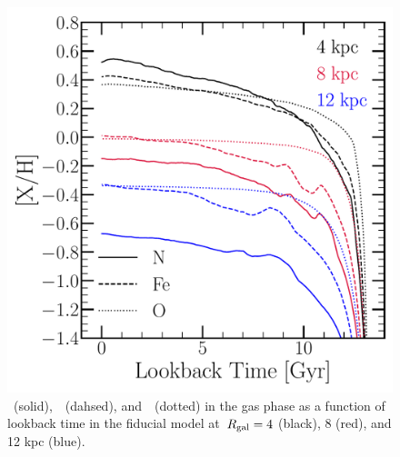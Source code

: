 \documentclass[ms.tex]{subfiles}
\begin{document}
\begin{figure}
\centering
\includegraphics[scale = 0.45]{nh_feh_vs_lookback.pdf}
\caption{
\nh~(solid),~\feh~(dahsed), and~\oh~(dotted) in the gas phase as a function of
lookback time in the fiducial model at~$R_\text{gal} = 4$ (black), 8 (red), and 12 kpc
(blue).
}
\label{fig:nh_feh_vs_lookback}
\end{figure}
\end{document}
